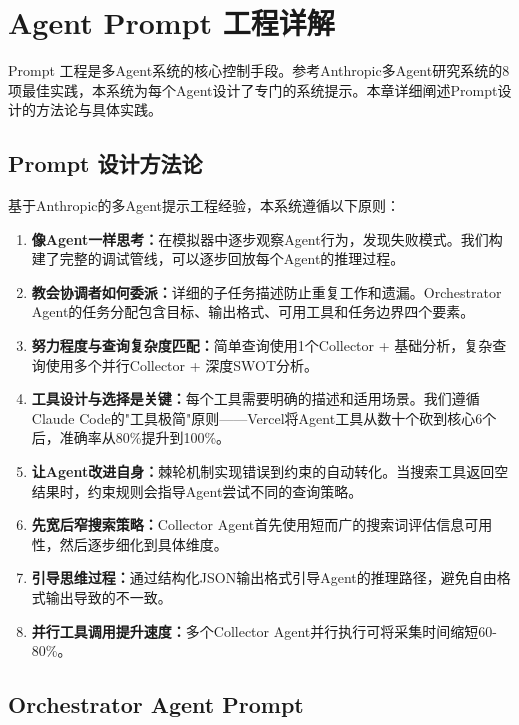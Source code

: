 \documentclass[12pt,a4paper]{ctexrep}
\begin{document}
\chapter{Agent Prompt 工程详解}

Prompt 工程是多Agent系统的核心控制手段。参考Anthropic多Agent研究系统的8项最佳实践，本系统为每个Agent设计了专门的系统提示。本章详细阐述Prompt设计的方法论与具体实践。

\section{Prompt 设计方法论}

基于Anthropic的多Agent提示工程经验，本系统遵循以下原则：

\begin{enumerate}
\item \textbf{像Agent一样思考：}在模拟器中逐步观察Agent行为，发现失败模式。我们构建了完整的调试管线，可以逐步回放每个Agent的推理过程。
\item \textbf{教会协调者如何委派：}详细的子任务描述防止重复工作和遗漏。Orchestrator Agent的任务分配包含目标、输出格式、可用工具和任务边界四个要素。
\item \textbf{努力程度与查询复杂度匹配：}简单查询使用1个Collector + 基础分析，复杂查询使用多个并行Collector + 深度SWOT分析。
\item \textbf{工具设计与选择是关键：}每个工具需要明确的描述和适用场景。我们遵循Claude Code的"工具极简"原则——Vercel将Agent工具从数十个砍到核心6个后，准确率从80\%提升到100\%。
\item \textbf{让Agent改进自身：}棘轮机制实现错误到约束的自动转化。当搜索工具返回空结果时，约束规则会指导Agent尝试不同的查询策略。
\item \textbf{先宽后窄搜索策略：}Collector Agent首先使用短而广的搜索词评估信息可用性，然后逐步细化到具体维度。
\item \textbf{引导思维过程：}通过结构化JSON输出格式引导Agent的推理路径，避免自由格式输出导致的不一致。
\item \textbf{并行工具调用提升速度：}多个Collector Agent并行执行可将采集时间缩短60-80\%。
\end{enumerate}

\section{Orchestrator Agent Prompt}
\end{document}
